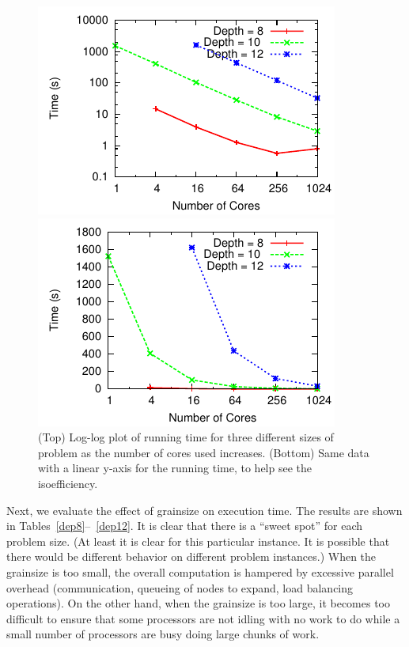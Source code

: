 \documentclass[10pt, conference, compsocconf]{IEEEtran}
\begin{document}
\begin{figure}[ht]
\centering
\begin{minipage}{0.7\linewidth}
\includegraphics[width=\columnwidth]{plots/3depths.pdf}
\end{minipage}
\centering
\begin{minipage}{0.7\linewidth}
\includegraphics[width=\columnwidth]{plots/3depthsnolog.pdf}
\end{minipage}
\caption{(Top) Log-log plot of running time for three different sizes of problem as the number of cores used increases.
(Bottom) Same data with a linear y-axis for the running time, to help see the isoefficiency.}
\label{3depths}
\end{figure}

Next, we evaluate the effect of grainsize on execution time.  The results are
shown in Tables~\ref{dep8}--~\ref{dep12}.  It is clear that there is a ``sweet
spot'' for each problem size.  (At least it is clear for this particular
instance.  It is possible that there would be different behavior on different
problem instances.)  When the grainsize is too small, the overall computation
is hampered by excessive parallel overhead (communication, queueing of nodes to
expand, load balancing operations).  On the other hand, when the grainsize is
too large, it becomes too difficult to ensure that some processors are not
idling with no work to do while a small number of processors are busy doing
large chunks of work.  
\end{document}
